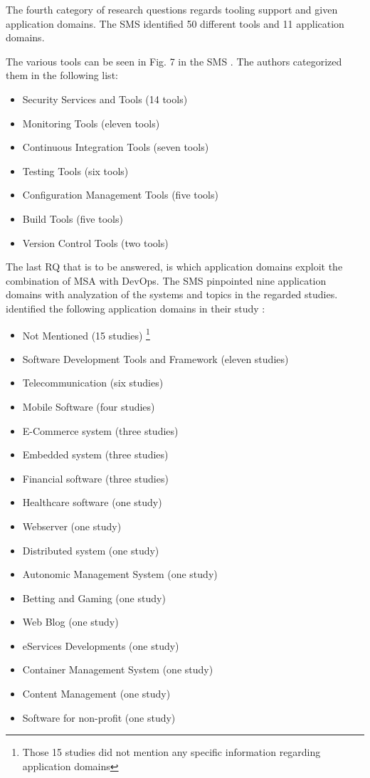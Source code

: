 The fourth category of research questions regards tooling support
and given application domains. The SMS identified 50 different tools and
11 application domains.

The various tools can be seen in Fig. 7 in the SMS \cite{waseem:SMSMSADevOps}.
The authors categorized them in the following list:

\begin{itemize}
    \item Security Services and Tools (14 tools)
    \item Monitoring Tools (eleven tools)
    \item Continuous Integration Tools (seven tools)
    \item Testing Tools (six tools)
    \item Configuration Management Tools (five tools)
    \item Build Tools (five tools)
    \item Version Control Tools (two tools)
\end{itemize}

The last RQ that is to be answered, is which application domains
exploit the combination of MSA with DevOps. The SMS pinpointed nine
application domains with analyzation of the systems and topics
in the regarded studies. \smsAuthors identified the following
application domains in their study \cite{waseem:SMSMSADevOps}:

\begin{itemize}
    \item Not Mentioned (15 studies) \footnote{Those 15 studies
    did not mention any specific information regarding application
    domains}
    \item Software Development Tools and Framework (eleven studies)
    \item Telecommunication (six studies)
    \item Mobile Software (four studies)
    \item E-Commerce system (three studies)
    \item Embedded system (three studies)
    \item Financial software (three studies)
    \item Healthcare software (one study)
    \item Webserver (one study)
    \item Distributed system (one study)
    \item Autonomic Management System (one study)
    \item Betting and Gaming (one study)
    \item Web Blog (one study)
    \item eServices Developments (one study)
    \item Container Management System (one study)
    \item Content Management (one study)
    \item Software for non-profit (one study)
\end{itemize}

